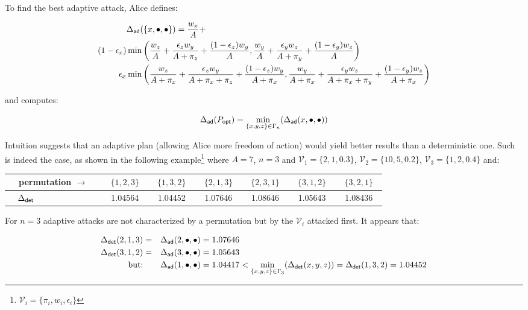 \documentclass[11pt]{llncs}
\begin{document}
To find the best adaptive attack, Alice defines:

\begin{alignat*}{10}
&\Delta_{\mbox{\scriptsize {\sf ad}}}(\{x,\bullet,\bullet\})=\frac{w_x}{A}+ \\
(1-\epsilon_x) & \min\bigg(\frac{w_z}{A}+\frac{\epsilon_z w_y}{A+\pi_z}+\frac{(1-\epsilon_z) w_y}{A},\frac{w_y}{A}+\frac{\epsilon_y w_z}{A+\pi_y}+\frac{(1-\epsilon_y) w_z}{A}\bigg)\\
\epsilon_x     & \min\bigg(\frac{w_z}{A+\pi_x}+\frac{\epsilon_z w_y}{A+\pi_x+\pi_z}+\frac{(1-\epsilon_z) w_y}{A+\pi_x},\frac{w_y}{A+\pi_x}+\frac{\epsilon_y w_z}{A+\pi_x+\pi_y}+\frac{(1-\epsilon_y) w_z}{A+\pi_x}\bigg)\\
\end{alignat*}

and computes:

$$
\Delta_{\mbox{\scriptsize {\sf ad}}}(P_{\mbox{\scriptsize {\sf opt}}})
= \min_{\{x,y,z\}\in\Gamma_n}(\Delta_{\mbox{\scriptsize {\sf ad}}}(x,\bullet,\bullet))$$

Intuition suggests that an adaptive plan (allowing Alice more freedom of action) would yield better results than a deterministic one. Such is indeed the case, as shown in the following example\footnote{$\mathcal{V}_i=\{\pi_i,w_i,\epsilon_i\}$} where $A=7$, $n=3$ and $\mathcal{V}_1=\{2,1,0.3\}$, $\mathcal{V}_2=\{10,5,0.2\}$, $\mathcal{V}_3=\{1,2,0.4\}$ and:\smallskip

\begin{center}
\begin{tabular}{|l|c|c|c|c|c|c|}\hline
~~permutation $\rightarrow$~~&~$\{1,2,3\}$~&~$\{1,3,2\}$~&~$\{2,1,3\}$~&~$\{2,3,1\}$~&~$\{3,1,2\}$~&~$\{3,2,1\}$~\\\hline
~~$\Delta_{\mbox{\scriptsize {\sf det}}}$&  1.04564 &  1.04452 &   1.07646 & 1.08646  & 1.05643  & 1.08436 \\\hline
\end{tabular}
\end{center}

For $n=3$ adaptive attacks are not characterized by a permutation but by the $\mathcal{V}_i$ attacked first. It appears that:

\begin{alignat*}{10}
\Delta_{\mbox{\scriptsize {\sf det}}}(2,1,3)&=&\Delta_{\mbox{\scriptsize {\sf ad}}}(2,\bullet,\bullet)&=1.07646\\
\Delta_{\mbox{\scriptsize {\sf det}}}(3,1,2)&=&\Delta_{\mbox{\scriptsize {\sf ad}}}(3,\bullet,\bullet)&=1.05643\\
\mbox{but:}                                 & &\Delta_{\mbox{\scriptsize {\sf ad}}}(1,\bullet,\bullet)&=1.04417<\min_{\{x,y,z\}\in\Gamma_3}(\Delta_{\mbox{\scriptsize {\sf det}}}(x,y,z))=\Delta_{\mbox{\scriptsize {\sf det}}}(1,3,2)=1.04452\\
\end{alignat*}
\smallskip
\end{document}
